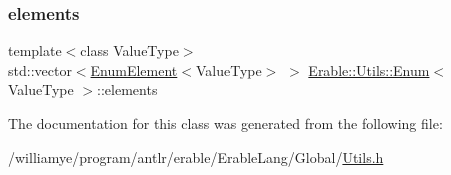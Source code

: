 \subsubsection{\texorpdfstring{elements}{elements}}
{\footnotesize\ttfamily template$<$class Value\+Type$>$ \\
std\+::vector$<$\mbox{\hyperlink{struct_erable_1_1_utils_1_1_enum_element}{Enum\+Element}}$<$Value\+Type$>$ $>$ \mbox{\hyperlink{class_erable_1_1_utils_1_1_enum}{Erable\+::\+Utils\+::\+Enum}}$<$ Value\+Type $>$\+::elements}



The documentation for this class was generated from the following file\+:\begin{DoxyCompactItemize}
\item 
/williamye/program/antlr/erable/\+Erable\+Lang/\+Global/\mbox{\hyperlink{_utils_8h}{Utils.\+h}}\end{DoxyCompactItemize}
